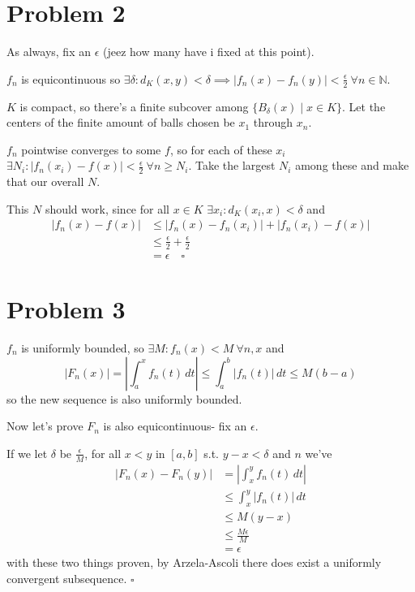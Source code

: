 \documentclass[12pt]{article}
\newcommand{\N}{\mathbb{N}}
\begin{document}
\section{Problem 2}

As always, fix an $\epsilon$ (jeez how many have i fixed at this point).

$f_n$ is equicontinuous so $\exists \delta: d_K(x, y) < \delta \implies |f_n(x)-f_n(y)| < \frac{\epsilon}{2}\ \forall n \in \N$.

$K$ is compact, so there's a finite subcover among $\{B_\delta(x) \mid x \in K\}$.
Let the centers of the finite amount of balls chosen be $x_1$ through $x_n$.

$f_n$ pointwise converges to some $f$,
so for each of these $x_i$ $\exists N_i: |f_n(x_i)-f(x)| < \frac{\epsilon}{2}\ \forall n \ge N_i$.
Take the largest $N_i$ among these and make that our overall $N$.

This $N$ should work, since for all $x \in K$ $\exists x_i: d_K(x_i, x) < \delta$ and
\begin{align*}
  |f_n(x)-f(x)|
   & \le |f_n(x)-f_n(x_i)|+|f_n(x_i)-f(x)|       \\
   & \le \frac{\epsilon}{2} + \frac{\epsilon}{2} \\
   & = \epsilon\quad\square
\end{align*}

\pagebreak

\section{Problem 3}

$f_n$ is uniformly bounded, so $\exists M: f_n(x) < M\ \forall n, x$ and
\[|F_n(x)|=\left|\int_{a}^{x} f_n(t)\,dt\right| \le \int_{a}^{b} |f_n(t)|\,dt \le M(b-a)\]
so the new sequence is also uniformly bounded.

Now let's prove $F_n$ is also equicontinuous- fix an $\epsilon$.

If we let $\delta$ be $\frac{\epsilon}{M}$,
for all $x < y$ in $[a, b]$ s.t. $y-x < \delta$ and $n$ we've
\begin{align*}
  |F_n(x)-F_n(y)|
   & = \left|\int_{x}^{y} f_n(t)\,dt\right| \\
   & \le \int_{x}^{y} |f_n(t)|\,dt          \\
   & \le M(y-x)                             \\
   & \le \frac{M\epsilon}{M}                \\
   & = \epsilon
\end{align*}
with these two things proven, by Arzela-Ascoli there does exist a uniformly convergent subsequence. $\square$
\end{document}
